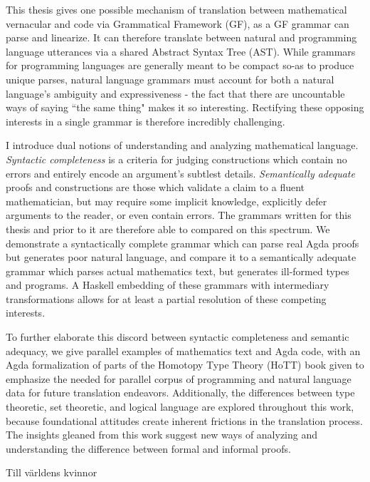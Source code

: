 \documentclass[11pt, a4paper]{article}
\begin{document}
This thesis gives one possible mechanism of translation between mathematical
vernacular and code via Grammatical Framework (GF), as a GF grammar can parse
and linearize. It can therefore translate between natural and programming
language utterances via a shared Abstract Syntax Tree (AST). While grammars for
programming languages are generally meant to be compact so-as to produce unique
parses, natural language grammars must account for both a natural language's
ambiguity and expressiveness - the fact that there are uncountable ways of
saying ``the same thing" makes it so interesting. Rectifying these opposing
interests in a single grammar is therefore incredibly challenging.

I introduce dual notions of understanding and analyzing mathematical language.
\emph{Syntactic completeness} is a criteria for judging constructions which
contain no errors and entirely encode an argument's subtlest details.
\emph{Semantically adequate} proofs and constructions are those which validate a
claim to a fluent mathematician, but may require some implicit knowledge,
explicitly defer arguments to the reader, or even contain errors. The grammars
written for this thesis and prior to it are therefore able to compared on this
spectrum. We demonstrate a syntactically complete grammar which can parse real
Agda proofs but generates poor natural language, and compare it to a
semantically adequate grammar which parses actual mathematics text, but
generates ill-formed types and programs. A Haskell embedding of these grammars
with intermediary transformations allows for at least a partial resolution of
these competing interests.

To further elaborate this discord between syntactic completeness and semantic
adequacy, we give parallel examples of mathematics text and Agda code,
with an Agda formalization of parts of the Homotopy Type Theory (HoTT) book
given to emphasize the needed for parallel corpus of programming and natural
language data for future translation endeavors. Additionally, the differences
between type theoretic, set theoretic, and logical language are explored
throughout this work, because foundational attitudes create inherent frictions
in the translation process. The insights gleaned from this work suggest new ways of
analyzing and understanding the difference between formal and informal proofs.

\thispagestyle{empty}

\newpage

\vspace*{\fill}
\begin{center}
\begin{minipage}{.25\textwidth}
Till världens kvinnor
\end{minipage}
\end{center}
\vspace*{\fill}
\end{document}
